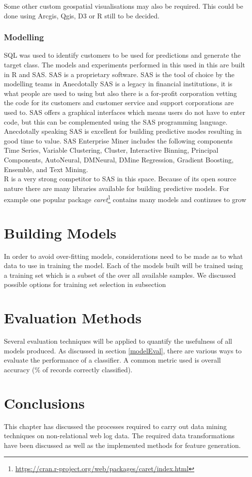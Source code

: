 Some other custom geospatial visualisations may also be required. This could be done using Arcgis, Qgis, D3 or R still to be decided.

\subsubsection{Modelling}
SQL was used to identify customers to be used for predictions and generate the target class.
The models and experiments performed in this used in this are built in R and SAS. SAS is a proprietary software. SAS is the tool of choice by the modelling teams in \subjectname\. Anecdotally SAS is a legacy in financial institutions, it is what people are used to using but also there is a for-profit corporation vetting the code for its customers and customer service and support corporations are used to. SAS offers a graphical interfaces which means users do not have to enter code, but this can be complemented using the SAS programming language. Anecdotally speaking SAS is excellent for building predictive modes resulting in good time to value. SAS Enterprise Miner includes the following components Time Series, Variable Clustering, Cluster, Interactive Binning, Principal Components, AutoNeural, DMNeural, DMine Regression, Gradient Boosting, Ensemble, and Text Mining.
\\
R is a very strong competitor to SAS in this space. Because of its open source nature there are many libraries available for building predictive models. For example one popular package \textit{caret}\footnote{{\url{https://cran.r-project.org/web/packages/caret/index.html}}} contains many models and continues to grow

\section{Building Models}
In order to avoid over-fitting models, considerations need to be made as to what data to use in training the model. Each of the models built will be trained using a training set which is a subset of the over all available samples. We discussed possible options for training set selection in subsection


\section{Evaluation Methods}
Several evaluation techniques will be applied to quantify the usefulness of all models produced. As discussed in section \ref{modelEval}, there are various ways to evaluate the performance of a classifier. A common metric used is overall accuracy (\% of records correctly classified). 


\section{Conclusions}\label{desConc}
This chapter has discussed the processes required to carry out data mining techniques on non-relational web log data. The required data transformations have been discussed as well as the implemented methods for feature generation.
